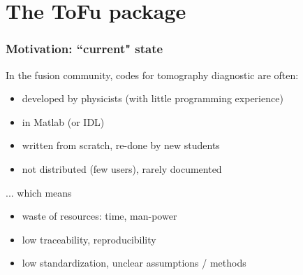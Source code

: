 \documentclass[10pt]{beamer}
\begin{document}
\section{The ToFu package}


\begin{frame}
\frametitle{Motivation: ``current" state}

	In the fusion community, codes for tomography diagnostic are often:
	\begin{itemize}
		\item  developed by physicists (with little programming experience)
		\item  in Matlab (or IDL)
		\item  written from scratch, re-done by new students
		\item  not distributed (few users), rarely documented
	\end{itemize}

... which means
\begin{itemize}
		\item  waste of resources: time, man-power
		\item  low traceability, reproducibility
		\item  low standardization, unclear assumptions / methods
	\end{itemize}
	
\end{frame}
\end{document}
